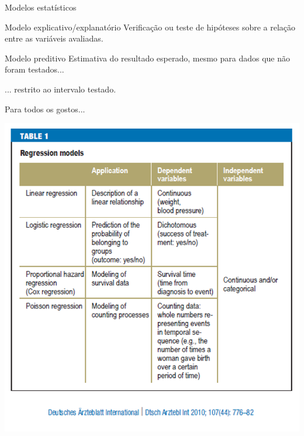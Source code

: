 \documentclass{beamer}
\begin{document}
\begin{frame}{Modelos estatísticos}
  \begin{block}{Modelo explicativo/explanatório}
    \small
    Verificação ou teste de hipóteses sobre a relação entre as variáveis avaliadas.
  \end{block}
  \bigskip
  \begin{block}{Modelo preditivo}
    \small
    Estimativa do resultado esperado, mesmo para dados que não foram testados...

    \bigskip
    \footnotesize
    ... restrito ao intervalo testado.
  \end{block}
\end{frame}

\begin{frame}{Para todos os gostos...}
  \begin{center}
    \includegraphics[height=\textheight]{Cap18-19/modelos-table1}
  \end{center}
\end{frame}
\end{document}
